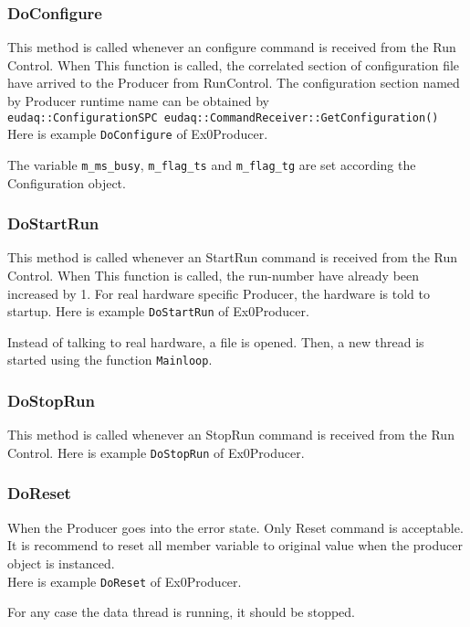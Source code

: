 \subsubsection{DoConfigure}
This method is called whenever an configure command is received from the Run Control. When This function is called, the correlated section of configuration file have arrived to the Producer from RunControl. The configuration section named by Producer runtime name can be obtained by \\
\lstinline[style=cpp]{eudaq::ConfigurationSPC eudaq::CommandReceiver::GetConfiguration()} \\

Here is example \lstinline[style=cpp]{DoConfigure} of Ex0Producer.

The variable \lstinline[style=cpp]{m_ms_busy}, \lstinline[style=cpp]{m_flag_ts} and \lstinline[style=cpp]{m_flag_tg} are set according the Configuration object.

\subsubsection{DoStartRun}\label{sec:ex0prdstart}
This method is called whenever an StartRun command is received from the Run Control. When This function is called, the run-number have already been increased by 1. For real hardware specific Producer, the hardware is told to startup.
Here is example \lstinline[style=cpp]{DoStartRun} of Ex0Producer.

Instead of talking to real hardware, a file is opened. Then, a new thread is started using the function \lstinline[style=cpp]{Mainloop}.

\subsubsection{DoStopRun}
This method is called whenever an StopRun command is received from the Run Control. Here is example \lstinline[style=cpp]{DoStopRun} of Ex0Producer.


\subsubsection{DoReset}
When the Producer goes into the error state. Only Reset command is acceptable. It is recommend to reset all member variable to original value when the producer object is instanced.\\
Here is example \lstinline[style=cpp]{DoReset} of Ex0Producer. 

For any case the data thread is running, it should be stopped.

